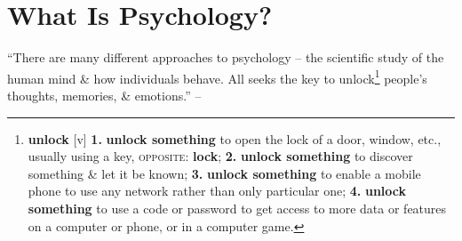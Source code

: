 \documentclass[oneside]{book}
\numberwithin{equation}{section}
\begin{document}
\section{What Is Psychology?}
``There are many different approaches to psychology -- the scientific study of the human mind \& how individuals behave. All seeks the key to unlock\footnote{\textbf{unlock} [v] \textbf{1.} \textbf{unlock something} to open the lock of a door, window, etc., usually using a key, \textsc{opposite}: \textbf{lock}; \textbf{2.} \textbf{unlock something} to discover something \& let it be known; \textbf{3.} \textbf{unlock something} to enable a mobile phone to use any network rather than only particular one; \textbf{4.} \textbf{unlock something} to use a code or password to get access to more data or features on a computer or phone, or in a computer game.} people's thoughts, memories, \& emotions.'' -- \cite[Foreword, p. 10]{DK2018}
\end{document}
